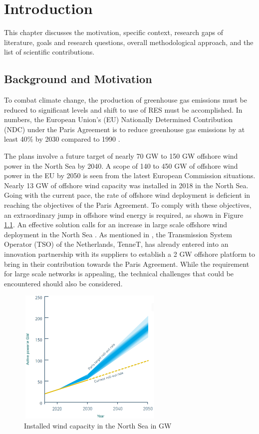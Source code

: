 \chapter{Introduction}\label{1}

This chapter discusses the motivation, specific context, research gaps of literature, goals and research questions, overall methodological approach, and the list of scientific contributions.

\section{Background and Motivation}\label{Background}

To combat climate change, the production of greenhouse gas emissions must be reduced to significant levels and shift to use of \gls{RES} must be accomplished. In numbers, the European Union's (\gls{EU}) Nationally Determined Contribution (NDC) under the Paris Agreement is to reduce greenhouse gas emissions by at least 40\% by 2030 compared to 1990 \cite{agreement2015unfccc}. 

The plans involve a future target of nearly 70 GW to 150 GW offshore wind power in the North Sea by 2040. A scope of 140 to 450 GW of offshore wind power in the \gls{EU} by 2050 is seen from the latest European Commission situations. Nearly 13 GW of offshore wind capacity was installed in 2018 in the North Sea. Going with the current pace, the rate of offshore wind deployment is deficient in reaching the objectives of the Paris Agreement. To comply with these objectives, an extraordinary jump in offshore wind energy is required, as shown in Figure \ref{fig:Paris_roll_out}. An effective solution calls for an increase in large scale offshore wind deployment in the North Sea \cite{noauthor_vision_nodate}. As mentioned in \cite{noauthor_tennet_2020}, the Transmission System Operator (TSO) of the Netherlands, TenneT, has already entered into an innovation partnership with its suppliers to establish a 2 GW offshore platform to bring in their contribution towards the Paris Agreement. While the requirement for large scale networks is appealing, the technical challenges that could be encountered should also be considered.  

\begin{figure}[H]
\centering
    \includegraphics[height = 6.5cm,width = 7cm]{Diagrams/Chapter_1/Paris.pdf}
    \caption{Installed wind capacity in the North Sea in GW \cite{noauthor_vision_nodate}}
    \label{fig:Paris_roll_out}
\end{figure}

